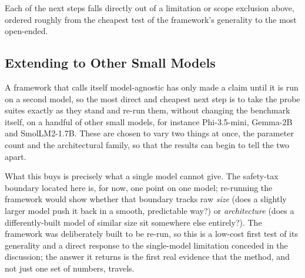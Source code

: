 Each of the next steps falls directly out of a limitation or scope exclusion above, ordered roughly from the cheapest test of the framework's generality to the most open-ended.

\subsection{Extending to Other Small Models}
\label{subsec:conclusion-future-extensions}

A framework that calls itself model-agnostic has only made a claim until it is run on a second model, so the most direct and cheapest next step is to take the probe suites exactly as they stand and re-run them, without changing the benchmark itself, on a handful of other small models, for instance Phi-3.5-mini, Gemma-2B and SmolLM2-1.7B. These are chosen to vary two things at once, the parameter count and the architectural family, so that the results can begin to tell the two apart.

What this buys is precisely what a single model cannot give. The safety-tax boundary located here is, for now, one point on one model; re-running the framework would show whether that boundary tracks raw \emph{size} (does a slightly larger model push it back in a smooth, predictable way?) or \emph{architecture} (does a differently-built model of similar size sit somewhere else entirely?). The framework was deliberately built to be re-run, so this is a low-cost first test of its generality and a direct response to the single-model limitation conceded in the discussion; the answer it returns is the first real evidence that the method, and not just one set of numbers, travels.

